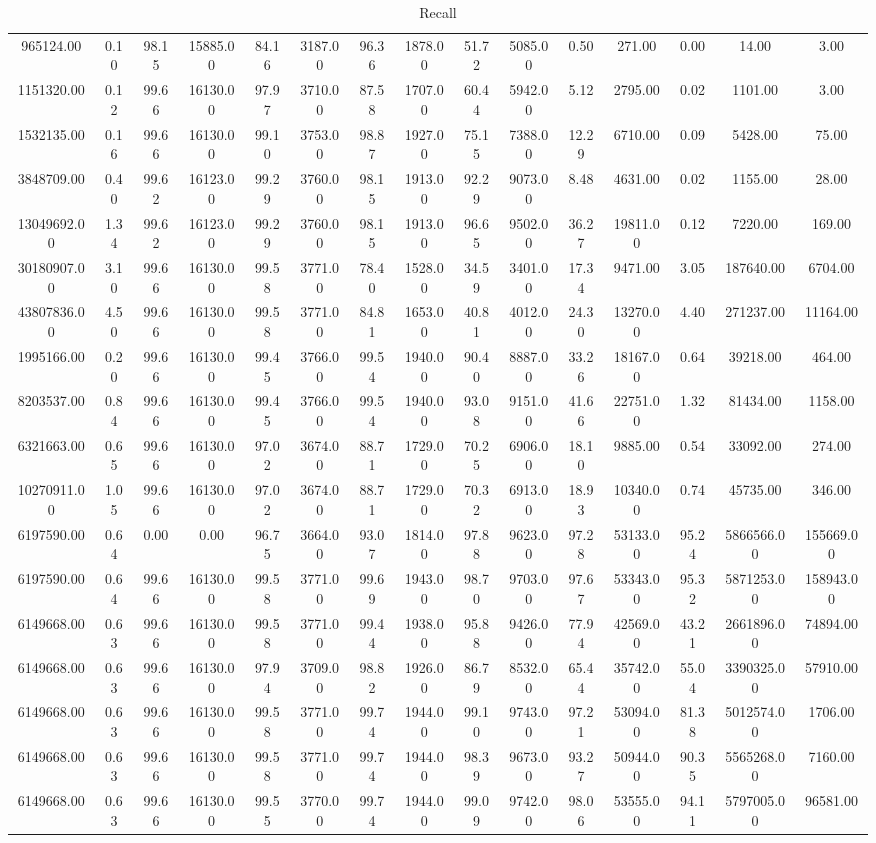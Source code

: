 \begin{table}
\caption{Recall}
\begin{tabular}{ccccccccccccccc}
965124.00& 0.10& 98.15& 15885.00& 84.16& 3187.00& 96.36& 1878.00& 51.72& 5085.00& 0.50& 271.00& 0.00& 14.00& 3.00\tabularnewline
1151320.00& 0.12& 99.66& 16130.00& 97.97& 3710.00& 87.58& 1707.00& 60.44& 5942.00& 5.12& 2795.00& 0.02& 1101.00& 3.00\tabularnewline
1532135.00& 0.16& 99.66& 16130.00& 99.10& 3753.00& 98.87& 1927.00& 75.15& 7388.00& 12.29& 6710.00& 0.09& 5428.00& 75.00\tabularnewline
3848709.00& 0.40& 99.62& 16123.00& 99.29& 3760.00& 98.15& 1913.00& 92.29& 9073.00& 8.48& 4631.00& 0.02& 1155.00& 28.00\tabularnewline
13049692.00& 1.34& 99.62& 16123.00& 99.29& 3760.00& 98.15& 1913.00& 96.65& 9502.00& 36.27& 19811.00& 0.12& 7220.00& 169.00\tabularnewline
30180907.00& 3.10& 99.66& 16130.00& 99.58& 3771.00& 78.40& 1528.00& 34.59& 3401.00& 17.34& 9471.00& 3.05& 187640.00& 6704.00\tabularnewline
43807836.00& 4.50& 99.66& 16130.00& 99.58& 3771.00& 84.81& 1653.00& 40.81& 4012.00& 24.30& 13270.00& 4.40& 271237.00& 11164.00\tabularnewline
1995166.00& 0.20& 99.66& 16130.00& 99.45& 3766.00& 99.54& 1940.00& 90.40& 8887.00& 33.26& 18167.00& 0.64& 39218.00& 464.00\tabularnewline
8203537.00& 0.84& 99.66& 16130.00& 99.45& 3766.00& 99.54& 1940.00& 93.08& 9151.00& 41.66& 22751.00& 1.32& 81434.00& 1158.00\tabularnewline
6321663.00& 0.65& 99.66& 16130.00& 97.02& 3674.00& 88.71& 1729.00& 70.25& 6906.00& 18.10& 9885.00& 0.54& 33092.00& 274.00\tabularnewline
10270911.00& 1.05& 99.66& 16130.00& 97.02& 3674.00& 88.71& 1729.00& 70.32& 6913.00& 18.93& 10340.00& 0.74& 45735.00& 346.00\tabularnewline
6197590.00& 0.64& 0.00& 0.00& 96.75& 3664.00& 93.07& 1814.00& 97.88& 9623.00& 97.28& 53133.00& 95.24& 5866566.00& 155669.00\tabularnewline
6197590.00& 0.64& 99.66& 16130.00& 99.58& 3771.00& 99.69& 1943.00& 98.70& 9703.00& 97.67& 53343.00& 95.32& 5871253.00& 158943.00\tabularnewline
6149668.00& 0.63& 99.66& 16130.00& 99.58& 3771.00& 99.44& 1938.00& 95.88& 9426.00& 77.94& 42569.00& 43.21& 2661896.00& 74894.00\tabularnewline
6149668.00& 0.63& 99.66& 16130.00& 97.94& 3709.00& 98.82& 1926.00& 86.79& 8532.00& 65.44& 35742.00& 55.04& 3390325.00& 57910.00\tabularnewline
6149668.00& 0.63& 99.66& 16130.00& 99.58& 3771.00& 99.74& 1944.00& 99.10& 9743.00& 97.21& 53094.00& 81.38& 5012574.00& 1706.00\tabularnewline
6149668.00& 0.63& 99.66& 16130.00& 99.58& 3771.00& 99.74& 1944.00& 98.39& 9673.00& 93.27& 50944.00& 90.35& 5565268.00& 7160.00\tabularnewline
6149668.00& 0.63& 99.66& 16130.00& 99.55& 3770.00& 99.74& 1944.00& 99.09& 9742.00& 98.06& 53555.00& 94.11& 5797005.00& 96581.00\tabularnewline

\end{tabular}
\end{table}

